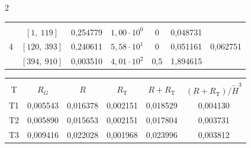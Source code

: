 \begin{multicols}{2}
\begin{table}[b]
\begin{center}
\begin{tabular}{|c|c|c|c|c|c|c|}
\hline

&&&&&&\\[-9pt]

 & $[1,~119]$ & 0,254779 & $1{,}00\cdot10^0$ & 0\hphantom{,0}   & 0,048731 & \\

4           & $[120,~393]$ & 0,240611 & $5{,}58\cdot10^1$ & 0\hphantom{,0}   & 0,051161 &0,062751\\

           & $[394,~910]$ & 0,003510 & $4{,}01\cdot10^2$ & 0,5 & 1,894615 &\\

\hline

\end{tabular}

\end{center}

\end{table}




\begin{table}\small

\begin{center}


\label{tab6}

\vspace{2ex}



\begin{tabular}{|c|c|c|c|c|c|}

\hline

&&&&&\\[-9pt]

T  & $R_G$ &  $R$ & $R_{\mathrm{T}}$ & $R+R_{\mathrm{T}}$ & 

$(R+R_{\mathrm{T}})/\tilde{H}^3$\\

\hline

T1 & 0,005543 & 0,016378 & 0,002151 & 0,018529 & 0,004130\\


T2 & 0,005890 & 0,015653 & 0,002151 & 0,017804 & 0,003731\\


T3 & 0,009416 & 0,022028 & 0,001968 & 0,023996 & 0,003812\\



\end{tabular}
\end{center}
\end{table}
\end{multicols}
